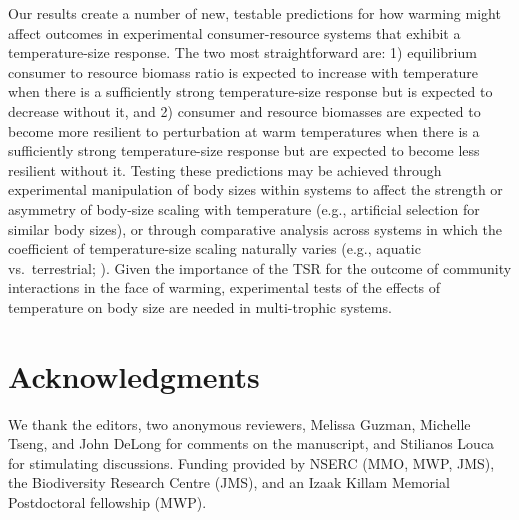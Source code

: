 \documentclass[11pt]{article}
\begin{document}
Our results create a number of new, testable predictions for how warming might affect outcomes in experimental consumer-resource systems that exhibit a temperature-size response.
The two most straightforward are: 
1) equilibrium consumer to resource biomass ratio is expected to increase with temperature when there is a sufficiently strong temperature-size response but is expected to decrease without it, and 
2) consumer and resource biomasses are expected to become more resilient to perturbation at warm temperatures when there is a sufficiently strong temperature-size response but are expected to become less resilient without it.
Testing these predictions may be achieved through experimental manipulation of body sizes within systems to affect the strength or asymmetry of body-size scaling with temperature (e.g., artificial selection for similar body sizes), or through comparative analysis across systems in which the coefficient of temperature-size scaling naturally varies (e.g., aquatic vs.\ terrestrial; \citealp{Forster2012,Horne2015}). 
Given the importance of the TSR for the outcome of community interactions in the face of warming, experimental tests of the effects of temperature on body size are needed in multi-trophic systems. 



\section*{Acknowledgments}
We thank the editors, two anonymous reviewers, Melissa Guzman, Michelle Tseng, and John DeLong for comments on the manuscript, and Stilianos Louca for stimulating discussions.
Funding provided by NSERC (MMO, MWP, JMS), the Biodiversity Research Centre (JMS), and an Izaak Killam Memorial Postdoctoral fellowship (MWP). 




\newpage{}

\end{document}
